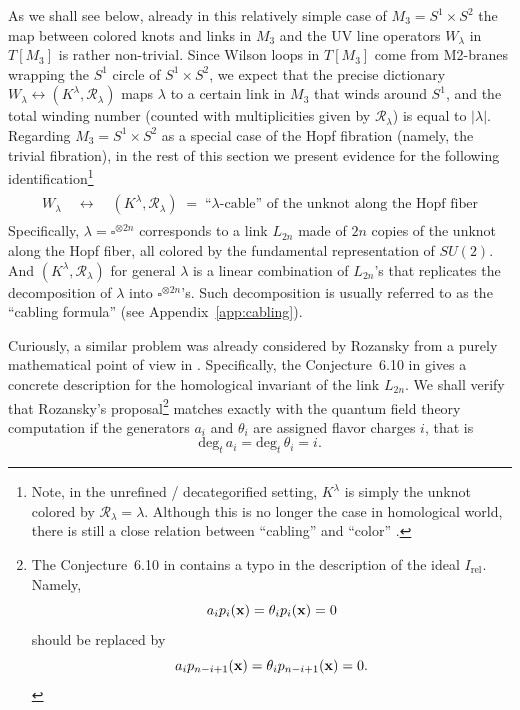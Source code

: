 \documentclass[hyper,letterpaper]{JHEP3}
\newcommand{\be}{\begin{equation}}
\newcommand{\ee}{\end{equation}}
\def\CR{{\mathcal R}}
\begin{document}
As we shall see below, already in this relatively simple case of $M_3 = S^1 \times S^2$ the map between
colored knots and links in $M_3$ and the UV line operators $W_{\lambda}$ in $T[M_3]$ is rather non-trivial.
Since Wilson loops in $T[M_3]$ come from M2-branes wrapping the $S^1$ circle of $S^1 \times S^2$,
we expect that the precise dictionary $W_{\lambda} \leftrightarrow (K^{\lambda}, \CR_{\lambda})$
maps $\lambda$ to a certain link in $M_3$ that winds around $S^1$,
and the total winding number (counted with multiplicities given by $\CR_{\lambda}$) is equal to $|\lambda|$.
Regarding $M_3 = S^1 \times S^2$ as a special case of the Hopf fibration (namely, the trivial fibration),
in the rest of this section we present evidence for the following identification\footnote{Note,
in the unrefined / decategorified setting, $K^{\lambda}$ is simply the unknot colored by $\CR_{\lambda} = \lambda$.
Although this is no longer the case in homological world, there is still a close relation between ``cabling''
and ``color'' \cite{khovanov2005categorifications,Gukov:2005qp}.}
\be
\boxed{\phantom{\int}
W_\lambda \quad \leftrightarrow \quad (K^{\lambda}, \CR_{\lambda}) \; = \; \text{``$\lambda$-cable'' of the unknot along the Hopf fiber}
\phantom{\int}}
\label{Gamma-Lp1}
\ee
Specifically, $\lambda = {\square}^{\otimes 2n}$ corresponds to a link $L_{2n}$ made of $2n$ copies of the unknot
along the Hopf fiber, all colored by the fundamental representation of $SU(2)$.
And $(K^{\lambda}, \CR_{\lambda})$ for general $\lambda$ is a linear combination of $L_{2n}$'s
that replicates the decomposition of $\lambda$ into ${\square}^{\otimes 2n}$'s.
Such decomposition is usually referred to as the ``cabling formula'' (see Appendix~\ref{app:cabling}).

Curiously, a similar problem was already considered by Rozansky from a purely mathematical point of view in \cite{rozansky2010categorification}.
Specifically, the Conjecture~6.10 in \cite{rozansky2010categorification} gives a concrete description for the homological invariant
of the link $L_{2n}$.
We shall verify that Rozansky's proposal\footnote{The Conjecture~6.10 in \cite{rozansky2010categorification} contains a typo in the description of the ideal $I_{\text{rel}}$. Namely,
\be\label{OldRelation}
a_i p_i({\bf x})=\theta_i p_i({\bf x})=0
\ee
should be replaced by
\be\label{NewRelation}
a_i p_{n-i+1}({\bf x})=\theta_i p_{n-i+1}({\bf x})=0.
\ee
} matches exactly with the quantum field theory computation if the generators $a_i$ and $\theta_i$ are assigned flavor charges $i$, that is
\be
\mathrm{deg}_t \, a_i=\mathrm{deg}_t \, \theta_i=i.
\ee
\end{document}
